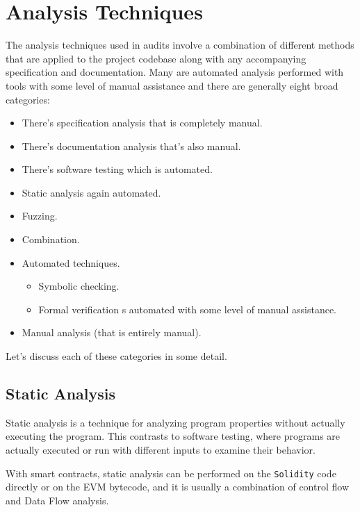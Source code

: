 \section{Analysis Techniques}\label{analysis-techniques}

The analysis techniques used in audits involve a combination of
different methods that are applied to the project codebase along with
any accompanying specification and documentation. Many are automated
analysis performed with tools with some level of manual assistance and
there are generally eight broad categories:

\begin{itemize}
\tightlist
\item
  There's specification analysis that is completely manual.
\item
  There's documentation analysis that's also manual.
\item
  There's software testing which is automated.
\item
  Static analysis again automated.
\item
  Fuzzing.
\item
  Combination.
\item
  Automated techniques.

  \begin{itemize}
  \tightlist
  \item
    Symbolic checking.
  \item
    Formal verification s automated with some level of manual
    assistance.
  \end{itemize}
\item
  Manual analysis (that is entirely manual).
\end{itemize}

Let's discuss each of these categories in some detail.

\subsection{Static Analysis}\label{static-analysis}

Static analysis is a technique for analyzing program properties without
actually executing the program. This contrasts to software testing,
where programs are actually executed or run with different inputs to
examine their behavior.

With smart contracts, static analysis can be performed on the
\texttt{Solidity} code directly or on the EVM bytecode, and it is
usually a combination of control flow and Data Flow analysis.

